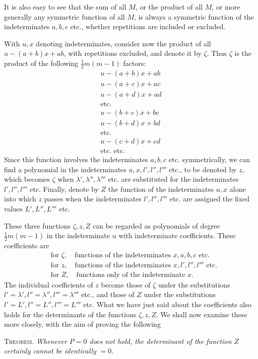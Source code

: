 It is also easy to see that the sum of all $M$, or the product of all $M$, or more generally any symmetric function of all $M$, is always a symmetric function of the indeterminates $a,b,c$ etc., whether repetitions are included or excluded.

With $u,x$ denoting indeterminates, consider now the product of all \mbox{$u-(a+b)x+ab$}, with repetitions excluded, and denote it by $\zeta$. Thus $\zeta$ is the product of the following \mbox{$\frac12m(m-1)$} factors:
\[
\begin{gathered}
u-(a+b)x+ab\\
u-(a+c)x+ac\\
u-(a+d)x+ad\\
\text{etc.}\\
u-(b+c)x+bc\\
u-(b+d)x+bd\\
\text{etc.}\\
u-(c+d)x+cd\\
\text{etc. etc.}
\end{gathered}
\]
Since this function involves the indeterminates $a,b,c$ etc. symmetrically, we can find a polynomial in the indeterminates $u,x,l',l'',l'''$ etc., to be denoted by $z$, which becomes $\zeta$ when $\lambda',\lambda'',\lambda'''$ etc. are substituted for the indeterminates $l',l'',l'''$ etc. Finally, denote by $Z$ the function of the indeterminates $u,x$ alone into which $z$ passes when the indeterminates $l',l'',l'''$ etc. are assigned the fixed values $L',L'',L'''$ etc.

These three functions $\zeta,z,Z$ can be regarded as polynomials of degree \mbox{$\frac12m(m-1)$} in the indeterminate $u$ with indeterminate coefficients. These
coefficients are
\[
\begin{aligned}
&\text{for }\zeta,\quad\text{functions of the indeterminates }x,a,b,c\text{ etc.}\\
&\text{for }z,\quad\text{functions of the indeterminates }x,l',l'',l'''\text{ etc.}\\
&\text{for }Z,\quad\text{functions only of the indeterminate }x.
\end{aligned}
\]
The individual coefficients of $z$ become those of $\zeta$ under the substitutions $l'=\lambda',l''=\lambda'',l'''=\lambda'''$ etc., and those of $Z$ under the substitutions $l'=L',l''=L'',l'''=L'''$ etc. What we have just said about the coefficients also holds for the determinants of the functions $\zeta,z,Z$. We shall now examine these more closely, with the aim of proving the following

\textsc{Theorem.} \textit{Whenever $P=0$ does not hold, the determinant of the function $Z$ certainly cannot be identically $=0$.}

